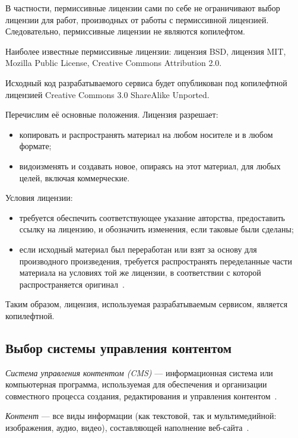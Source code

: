 В частности, пермиссивные лицензии сами по себе не ограничивают выбор лицензии для работ,
производных от работы с пермиссивной лицензией. Следовательно, пермиссивные лицензии не являются копилефтом.

Наиболее известные пермиссивные лицензии: лицензия BSD, лицензия MIT, Mozilla Public License, Creative Commons Attribution 2.0.

Исходный код разрабатываемого сервиса будет опубликован под копилефтной лицензией 
Creative Commons 3.0 ShareAlike Unported.

Перечислим её основные положения. Лицензия разрешает:
\begin{itemize}
\item копировать и распространять материал на любом носителе и в любом формате;
\item видоизменять и создавать новое, опираясь на этот материал, для любых целей, включая коммерческие.
\end{itemize}

Условия лицензии:
\begin{itemize}
\item требуется обеспечить соответствующее указание авторства, предоставить ссылку на лицензию,
  и обозначить изменения, если таковые были сделаны;
\item если исходный материал был переработан или взят за основу для производного произведения,
  требуется распространять переделанные части материала на условиях той же лицензии, 
  в соответствии с которой распространяется оригинал~\cite{cc_by_sa}.
\end{itemize}

Таким образом, лицензия, используемая разрабатываемым сервисом, является копилефтной. 

\subsection{Выбор системы управления контентом}
\label{ssec:choice_cms}

\textit{Система управления контентом (CMS)} --- информационная система или компьютерная программа,
используемая для обеспечения и организации совместного процесса создания,
редактирования и управления контентом~\cite{wiki_cms}.

\textit{Контент} --- все виды информации (как текстовой, так и мультимедийной: изображения, аудио, видео),
составляющей наполнение веб-сайта~\cite{wiki_content}.

